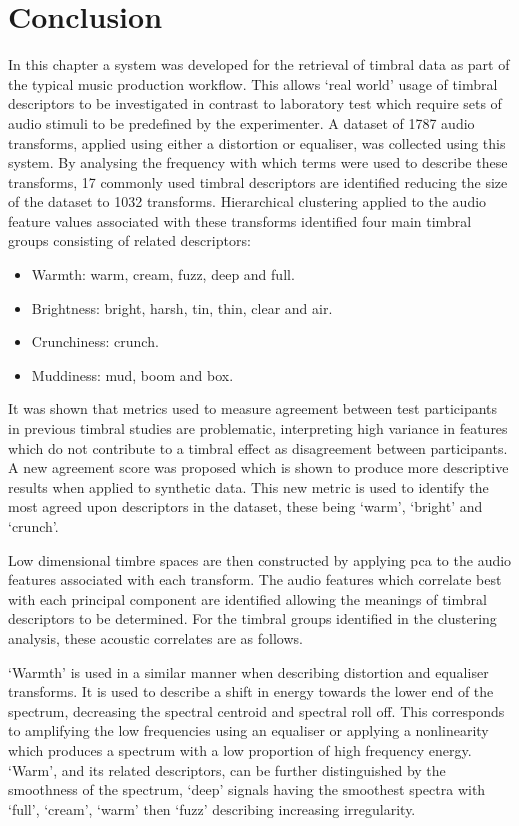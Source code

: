 \section{Conclusion}
	In this chapter a system was developed for the retrieval of timbral data as part of the typical music production
	workflow. This allows `real world' usage of timbral descriptors to be investigated in contrast to laboratory test
	which require sets of audio stimuli to be predefined by the experimenter. A dataset of 1787 audio transforms,
	applied using either a distortion or equaliser, was collected using this system. By analysing the frequency with
	which terms were used to describe these transforms, 17 commonly used timbral descriptors are identified reducing
	the size of the dataset to 1032 transforms.  Hierarchical clustering applied to the audio feature values associated
	with these transforms identified four main timbral groups consisting of related descriptors:

	\begin{itemize}
		\item Warmth: warm, cream, fuzz, deep and full.
		\item Brightness: bright, harsh, tin, thin, clear and air.
		\item Crunchiness: crunch.
		\item Muddiness: mud, boom and box.
	\end{itemize}

	It was shown that metrics used to measure agreement between test participants in previous timbral studies are
	problematic, interpreting high variance in features which do not contribute to a timbral effect as disagreement
	between participants. A new agreement score was proposed which is shown to produce more descriptive results when
	applied to synthetic data. This new metric is used to identify the most agreed upon descriptors in the dataset,
	these being `warm', `bright' and `crunch'.

	Low dimensional timbre spaces are then constructed by applying \acrshort{pca} to the audio features associated with
	each transform. The audio features which correlate best with each principal component are identified allowing the
	meanings of timbral descriptors to be determined. For the timbral groups identified in the clustering analysis,
	these acoustic correlates are as follows.

	`Warmth' is used in a similar manner when describing distortion and equaliser transforms. It is used to describe a
	shift in energy towards the lower end of the spectrum, decreasing the spectral centroid and spectral roll off. This
	corresponds to amplifying the low frequencies using an equaliser or applying a nonlinearity which produces a
	spectrum with a low proportion of high frequency energy. `Warm', and its related descriptors, can be further
	distinguished by the smoothness of the spectrum, `deep' signals having the smoothest spectra with `full', `cream',
	`warm' then `fuzz' describing increasing irregularity.

